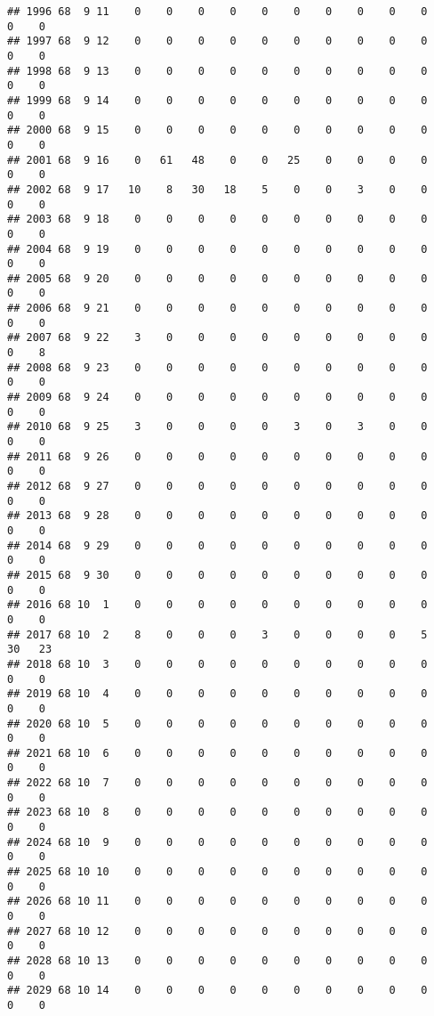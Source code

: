 \documentclass[]{article}
\begin{document}
\begin{verbatim}
## 1996 68  9 11    0    0    0    0    0    0    0    0    0    0    0    0
## 1997 68  9 12    0    0    0    0    0    0    0    0    0    0    0    0
## 1998 68  9 13    0    0    0    0    0    0    0    0    0    0    0    0
## 1999 68  9 14    0    0    0    0    0    0    0    0    0    0    0    0
## 2000 68  9 15    0    0    0    0    0    0    0    0    0    0    0    0
## 2001 68  9 16    0   61   48    0    0   25    0    0    0    0    0    0
## 2002 68  9 17   10    8   30   18    5    0    0    3    0    0    0    0
## 2003 68  9 18    0    0    0    0    0    0    0    0    0    0    0    0
## 2004 68  9 19    0    0    0    0    0    0    0    0    0    0    0    0
## 2005 68  9 20    0    0    0    0    0    0    0    0    0    0    0    0
## 2006 68  9 21    0    0    0    0    0    0    0    0    0    0    0    0
## 2007 68  9 22    3    0    0    0    0    0    0    0    0    0    0    8
## 2008 68  9 23    0    0    0    0    0    0    0    0    0    0    0    0
## 2009 68  9 24    0    0    0    0    0    0    0    0    0    0    0    0
## 2010 68  9 25    3    0    0    0    0    3    0    3    0    0    0    0
## 2011 68  9 26    0    0    0    0    0    0    0    0    0    0    0    0
## 2012 68  9 27    0    0    0    0    0    0    0    0    0    0    0    0
## 2013 68  9 28    0    0    0    0    0    0    0    0    0    0    0    0
## 2014 68  9 29    0    0    0    0    0    0    0    0    0    0    0    0
## 2015 68  9 30    0    0    0    0    0    0    0    0    0    0    0    0
## 2016 68 10  1    0    0    0    0    0    0    0    0    0    0    0    0
## 2017 68 10  2    8    0    0    0    3    0    0    0    0    5   30   23
## 2018 68 10  3    0    0    0    0    0    0    0    0    0    0    0    0
## 2019 68 10  4    0    0    0    0    0    0    0    0    0    0    0    0
## 2020 68 10  5    0    0    0    0    0    0    0    0    0    0    0    0
## 2021 68 10  6    0    0    0    0    0    0    0    0    0    0    0    0
## 2022 68 10  7    0    0    0    0    0    0    0    0    0    0    0    0
## 2023 68 10  8    0    0    0    0    0    0    0    0    0    0    0    0
## 2024 68 10  9    0    0    0    0    0    0    0    0    0    0    0    0
## 2025 68 10 10    0    0    0    0    0    0    0    0    0    0    0    0
## 2026 68 10 11    0    0    0    0    0    0    0    0    0    0    0    0
## 2027 68 10 12    0    0    0    0    0    0    0    0    0    0    0    0
## 2028 68 10 13    0    0    0    0    0    0    0    0    0    0    0    0
## 2029 68 10 14    0    0    0    0    0    0    0    0    0    0    0    0

\end{verbatim}
\end{document}
